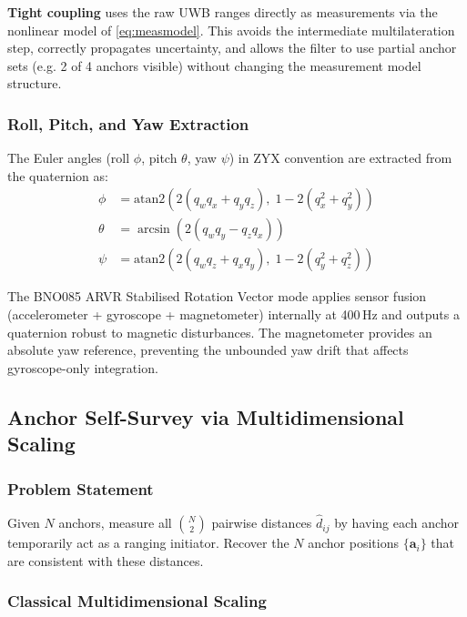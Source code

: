 \documentclass[11pt,a4paper]{article}
\newcommand{\vect}[1]{\bm{#1}}
\begin{document}
\textbf{Tight coupling} uses the raw UWB ranges directly as measurements via the nonlinear model of \cref{eq:measmodel}. This avoids the intermediate multilateration step, correctly propagates uncertainty, and allows the filter to use partial anchor sets (e.g. 2 of 4 anchors visible) without changing the measurement model structure.

\subsubsection{Roll, Pitch, and Yaw Extraction}

The Euler angles (roll $\phi$, pitch $\theta$, yaw $\psi$) in ZYX convention are extracted from the quaternion as:
\begin{align}
\phi   &= \text{atan2}\!\left(2(q_w q_x + q_y q_z),\; 1 - 2(q_x^2 + q_y^2)\right) \label{eq:roll}\\
\theta &= \arcsin\!\left(2(q_w q_y - q_z q_x)\right) \label{eq:pitch}\\
\psi   &= \text{atan2}\!\left(2(q_w q_z + q_x q_y),\; 1 - 2(q_y^2 + q_z^2)\right) \label{eq:yaw}
\end{align}

The BNO085 ARVR Stabilised Rotation Vector mode applies sensor fusion (accelerometer + gyroscope + magnetometer) internally at 400\,Hz and outputs a quaternion robust to magnetic disturbances. The magnetometer provides an absolute yaw reference, preventing the unbounded yaw drift that affects gyroscope-only integration.

\subsection{Anchor Self-Survey via Multidimensional Scaling}

\subsubsection{Problem Statement}

Given $N$ anchors, measure all $\binom{N}{2}$ pairwise distances $\hat{d}_{ij}$ by having each anchor temporarily act as a ranging initiator. Recover the $N$ anchor positions $\{\vect{a}_i\}$ that are consistent with these distances.

\subsubsection{Classical Multidimensional Scaling}
\end{document}
